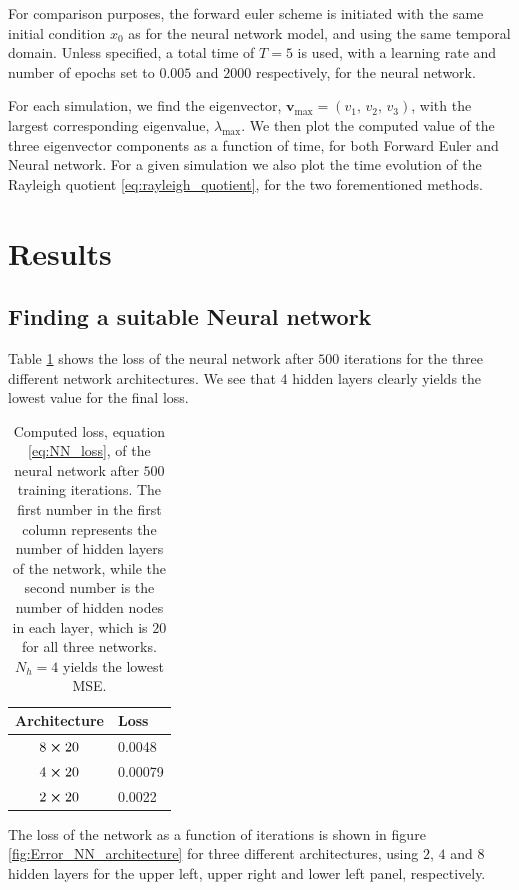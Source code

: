 \documentclass[12pt]{extarticle}
\begin{document}
For comparison purposes, the forward euler scheme is initiated with the same initial condition $x_0$ as for the neural network model, and using the same temporal domain. Unless specified, a total time of $T=5$ is used, with a learning rate and number of epochs set to $0.005$ and $2000$ respectively, for the neural network.

For each simulation, we find the eigenvector, $\mathbf{v}_\mathrm{max}=(v_1,\,v_2,\,v_3)$, with the largest corresponding eigenvalue, $\lambda_\mathrm{max}$. We then plot the computed value of the three eigenvector components as a function of time, for both Forward Euler and Neural network. For a given simulation we also plot the time evolution of the Rayleigh quotient \eqref{eq:rayleigh_quotient}, for the two forementioned methods.   


\section{Results}

\subsection{Finding a suitable Neural network}

Table \ref{tab:NN_architecture_loss} shows the loss of the neural network after $500$ iterations for the three different network architectures. We see that $4$ hidden layers clearly yields the lowest value for the final loss. 
\begin{table}[h]
	\centering
	\begin{tabular}{|c|l|}
		\hline
		Architecture & Loss   \\ \hline
		$8\cross20$         & 0.0048 \\ \hline
		$4\cross20$         & 0.00079 \\ \hline
		$2\cross20$         & 0.0022 \\ \hline
	\end{tabular}
	\caption{Computed loss, equation \eqref{eq:NN_loss}, of the neural network after $500$ training iterations. The first number in the first column represents the number of hidden layers of the network, while the second number is the number of hidden nodes in each layer, which is $20$ for all three networks. $N_h=4$ yields the lowest MSE.}
	\label{tab:NN_architecture_loss}
\end{table}

The loss of the network as a function of iterations is shown in figure \ref{fig:Error_NN_architecture} for three different architectures, using $2$, $4$ and $8$ hidden layers for the upper left, upper right and lower left panel, respectively. 
\end{document}
